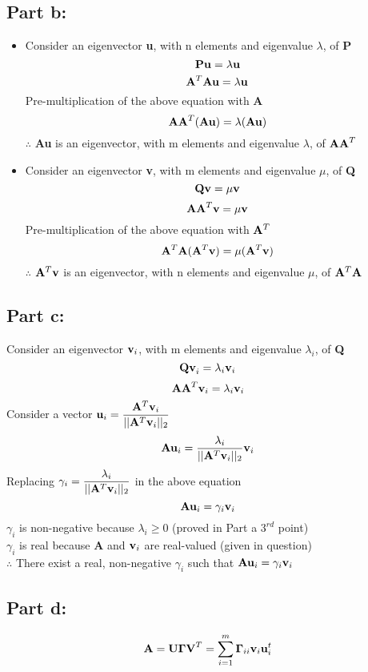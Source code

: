 \documentclass[12pt, a4paper]{article}
\begin{document}
\subsection*{Part b:}
\begin{itemize}
\item Consider an eigenvector {\bf u}, with n elements and eigenvalue $\lambda$, of {\bf P}
\[{\bf Pu}= \lambda{\bf u}\] 
\[{\bf A}^T{\bf Au}=\lambda{\bf u}\]
Pre-multiplication of the above equation with {\bf A}
\[{\bf AA}^T({\bf Au})=\lambda({\bf Au})\]
$\therefore$ {\bf Au} is an eigenvector, with m elements and eigenvalue $\lambda$, of ${\bf AA}^T$ 

\item Consider an eigenvector {\bf v}, with m elements and eigenvalue $\mu$, of {\bf Q}
\[{\bf Qv}= \mu{\bf v}\] 
\[{\bf AA}^T{\bf v}=\mu{\bf v}\]
Pre-multiplication of the above equation with ${\bf A}^T$
\[{\bf A}^T{\bf A}({\bf A}^T{\bf v})=\mu({\bf A}^T{\bf v})\]
$\therefore$ ${\bf A}^T{\bf v}$ is an eigenvector, with n elements and eigenvalue $\mu$, of ${\bf A}^T{\bf A}$ 

\end{itemize}

\subsection*{Part c:}
Consider an eigenvector ${\bf v}_i$, with m elements and eigenvalue $\lambda_i$, of {\bf Q} 
\[{\bf Qv}_i=\lambda_i{\bf v}_i\]
\[{\bf AA}^T{\bf v}_i=\lambda_i{\bf v}_i\]
Consider a vector \(\displaystyle {\bf u}_i=\frac{{\bf A}^T{\bf v}_i}{||{\bf A}^T{\bf v}_i||_2}\) 
\[{\bf Au}_i=\frac{\lambda_i}{||{\bf A}^T{\bf v}_i||_2}{\bf v}_i\]
Replacing \(\displaystyle \gamma_i=\frac{\lambda_i}{||{\bf A}^T{\bf v}_i||_2}\) in the above equation
\[{\bf Au}_i=\gamma_i{\bf v}_i\]
$\gamma_i$ is non-negative because $\lambda_i\geq0$ (proved in Part a $3^{rd}$ point)\\
$\gamma_i$ is real because {\bf A} and ${\bf v}_i$ are real-valued (given in question)\\
$\therefore$ There exist a real, non-negative $\gamma_i$ such that ${\bf Au}_i=\gamma_i{\bf v}_i$ 
\pagebreak
\subsection*{Part d:}

\[{\bf A}={\bf U\Gamma V}^T=\sum_{i=1}^m {\bf \Gamma}_{ii}{\bf v}_i{\bf u}_i^t\]
\end{document}
